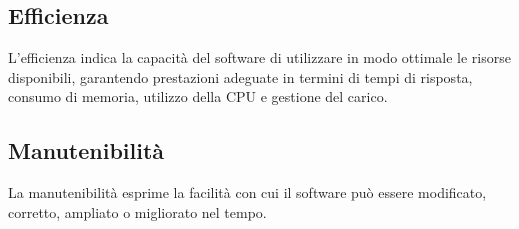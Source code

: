 \subsection{Efficienza}
L’efficienza indica la capacità del software di utilizzare in modo ottimale le risorse disponibili, garantendo prestazioni adeguate in termini di tempi di risposta, consumo di memoria, utilizzo della CPU e gestione del carico.
\begin{table}[h]
    \centering
    \renewcommand{\arraystretch}{1.15}
    \vspace{-0.3cm}
    \caption{Efficienza del prodotto}
\end{table}

\subsection{Manutenibilità}
La manutenibilità esprime la facilità con cui il software può essere modificato, corretto, ampliato o migliorato nel tempo.
\begin{table}[h]
    \centering
    \renewcommand{\arraystretch}{1.15}
    \vspace{-0.3cm}
    \caption{Manutenibilità del prodotto}
\end{table}